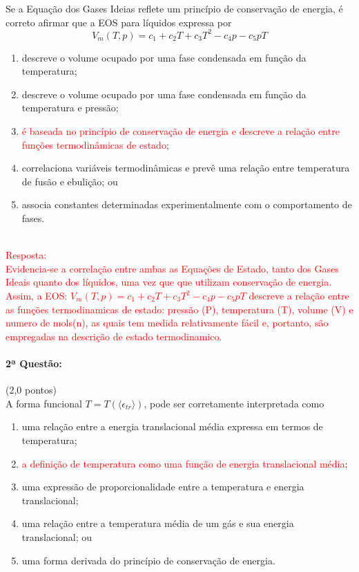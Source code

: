 \documentclass[12pt,a4paper]{article}
\begin{document}
Se a Equação dos Gases Ideias reflete um princípio de conservação de energia, é correto afirmar que a EOS para líquidos expressa por 
\begin{equation*}
    V_{m}(T, p) = c_{1} + c_{2}T + c_{3} T^{2} - c_{4} p - c_{5}pT    
\end{equation*}

\begin{enumerate} [label = (\alph*)]
    \item descreve o volume ocupado por uma fase condensada em função da temperatura;
    \item descreve o volume ocupado por uma fase condensada em função da temperatura e pressão;
    \item \textcolor{red}{é baseada no princípio de conservação de energia e descreve a relação entre funções termodinâmicas de estado};
    \item correlaciona variáveis termodinâmicas e prevê uma relação entre temperatura de fusão e ebulição; ou 
    \item associa constantes determinadas experimentalmente com o comportamento de fases.
\end{enumerate} \\ 

\textcolor{red}{Resposta: \\
Evidencia-se a correlação entre ambas as Equações de Estado, tanto dos Gases Ideais quanto dos líquidos, uma vez que que utilizam conservação de energia.\\
Assim, a EOS: $ V_{m}(T, p) = c_{1} + c_{2}T + c_{3} T^{2} - c_{4} p - c_{5}pT$ descreve a relação entre as funções termodinamicas de estado: pressão (P), temperatura (T), volume (V) e numero de mols(n), as quais tem medida relativamente fácil e, portanto, são empregadas na descrição de estado termodinamico.}

\newpage

\paragraph{2ª Questão:} (2,0 pontos) \\ [0.3cm]


A forma funcional $T = T \left(\langle \epsilon_{tr} \rangle\right)$, pode ser corretamente interpretada como
\begin{enumerate} [label = (\alph*)]
    \item uma relação entre a energia translacional média expressa em termos de temperatura;
    \item \textcolor{red}{a definição de temperatura como uma função de energia translacional média};
    \item uma expressão de proporcionalidade entre a temperatura e energia translacional;
    \item uma relação entre a temperatura média de um gás e sua energia translacional; ou
    \item uma forma derivada do princípio de conservação de energia.  \\ 
\end{enumerate}
\end{document}
